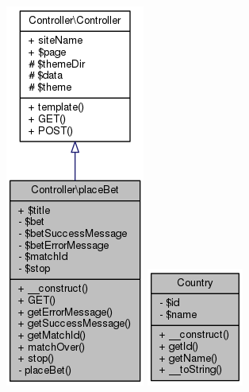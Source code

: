\documentclass[11pt]{article}
\begin{document}
\includegraphics[scale=0.4]{UML_Controller_1_1placeBet.png}
\includegraphics[scale=0.4]{UML_Country.png}
\end{document}
